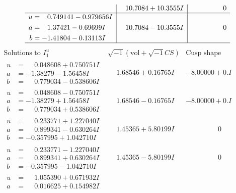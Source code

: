 \documentclass[1p]{elsarticle_modified}
\theoremstyle{definition}
\newcommand{\I}{\sqrt{-1}}
\begin{document}
$$\begin{array}{c|c|c}
 & \phantom{-}10.7084 + 10.3555 I & \phantom{-0.000000 } 0 \\ \hline\begin{aligned}
u &= \phantom{-}0.749141 - 0.979656 I \\
a &= \phantom{-}1.37421 - 0.69699 I \\
b &= -1.41804 - 0.13113 I\end{aligned}
 & \phantom{-}10.7084 - 10.3555 I & \phantom{-0.000000 } 0\\
 \hline 
 \end{array}$$\newpage$$\begin{array}{c|c|c}  
\text{Solutions to }I^u_{1}& \I (\text{vol} + \sqrt{-1}CS) & \text{Cusp shape}\\
 \hline 
\begin{aligned}
u &= \phantom{-}0.048608 + 0.750751 I \\
a &= -1.38279 - 1.56458 I \\
b &= \phantom{-}0.779034 - 0.538606 I\end{aligned}
 & \phantom{-}1.68546 + 0.16765 I & -8.00000 + 0. I\phantom{ +0.000000I} \\ \hline\begin{aligned}
u &= \phantom{-}0.048608 - 0.750751 I \\
a &= -1.38279 + 1.56458 I \\
b &= \phantom{-}0.779034 + 0.538606 I\end{aligned}
 & \phantom{-}1.68546 - 0.16765 I & -8.00000 + 0. I\phantom{ +0.000000I} \\ \hline\begin{aligned}
u &= \phantom{-}0.233771 + 1.227040 I \\
a &= \phantom{-}0.899341 - 0.630264 I \\
b &= -0.357995 + 1.042710 I\end{aligned}
 & \phantom{-}1.45365 + 5.80199 I & \phantom{-0.000000 } 0 \\ \hline\begin{aligned}
u &= \phantom{-}0.233771 - 1.227040 I \\
a &= \phantom{-}0.899341 + 0.630264 I \\
b &= -0.357995 - 1.042710 I\end{aligned}
 & \phantom{-}1.45365 - 5.80199 I & \phantom{-0.000000 } 0 \\ \hline\begin{aligned}
u &= \phantom{-}1.055390 + 0.671932 I \\
a &= \phantom{-}0.016625 + 0.154982 I \\

\end{aligned}
\end{array}$$
\end{document}
